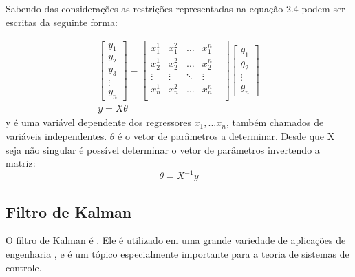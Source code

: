 Sabendo das considerações as restrições representadas na equação 2.4 podem ser escritas da seguinte forma:

\begin{equation}
\begin{array}{c}
\begin{bmatrix}
y_1 \\ y_2 \\ y_3\\ \vdots \\ y_n
\end{bmatrix}
=
\begin{bmatrix}
x^1_1 & x^2_1 & \dots & x^n_1\\
x^1_2 & x^2_2 & \dots & x^n_2\\
\vdots & \vdots & \ddots& \vdots&\\
x^1_n & x^2_n & \dots & x^n_n\\
\end{bmatrix}
\begin{bmatrix}
\theta_1 \\ \theta_2 \\ \vdots \\ \theta_n
\end{bmatrix}
\\
y=X \theta
\end{array}
\end{equation}
y é uma variável dependente  dos regressores $x_1,... x_n$, também chamados de variáveis independentes. $\theta$ é o vetor de parâmetros a determinar. Desde que X seja não singular é possível determinar o vetor de parâmetros invertendo a matriz:
\begin{equation}
\theta=X^{-1}y
\end{equation}


\subsection {Filtro de Kalman}
O filtro de Kalman é . Ele é utilizado em uma grande variedade de aplicações de engenharia , e é um tópico especialmente importante para a teoria de sistemas de controle. 
